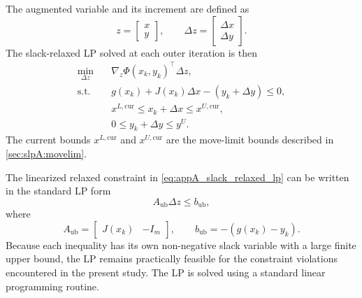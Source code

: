 \documentclass[11pt,a4paper]{article}
\begin{document}
The augmented variable and its increment are defined as
\begin{equation}
\label{eq:appA_augmented_variable}
    z =
    \begin{bmatrix}
        x \\ y
    \end{bmatrix},
    \qquad
    \Delta z =
    \begin{bmatrix}
        \Delta x \\ \Delta y
    \end{bmatrix}.
\end{equation}
The slack-relaxed LP solved at each outer iteration is then
\begin{equation}
\label{eq:appA_slack_relaxed_lp}
\begin{aligned}
    \min_{\Delta z}\quad
        & \nabla_z \Phi(x_k,y_k)^{\!\top}\Delta z ,
    \\
    \text{s.t.}\quad
        & g(x_k) + J(x_k)\Delta x - (y_k + \Delta y) \leq 0 ,
    \\
        & x^{L,\mathrm{cur}}
          \leq
          x_k + \Delta x
          \leq
          x^{U,\mathrm{cur}},
    \\
        & 0
          \leq
          y_k + \Delta y
          \leq
          y^U .
\end{aligned}
\end{equation}
The current bounds $x^{L,\mathrm{cur}}$ and $x^{U,\mathrm{cur}}$ are
the move-limit bounds described in \autoref{sec:slpA:movelim}.

The linearized relaxed constraint in \autoref{eq:appA_slack_relaxed_lp}
can be written in the standard LP form
\begin{equation}
\label{eq:appA_lp_standard_form}
    A_{\mathrm{ub}}\Delta z \leq b_{\mathrm{ub}},
\end{equation}
where
\begin{equation}
\label{eq:appA_lp_standard_matrices}
    A_{\mathrm{ub}}
    =
    \begin{bmatrix}
        J(x_k) & -I_m
    \end{bmatrix},
    \qquad
    b_{\mathrm{ub}}
    =
    -\left(g(x_k)-y_k\right).
\end{equation}
Because each inequality has its own non-negative slack variable with
a large finite upper bound, the LP remains practically feasible for
the constraint violations encountered in the present study. The LP is
solved using a standard linear programming routine.

\end{document}
